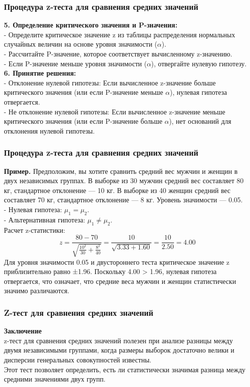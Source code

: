 \documentclass[aspectratio=169]{beamer}
\begin{document}
\begin{frame}
\frametitle{Процедура z-теста для сравнения средних значений}
{\bf 5. Определение критического значения и P-значения:}\\
- Определите критическое значение z из таблицы распределения нормальных случайных величин на основе уровня значимости ($\alpha$).\\
- Рассчитайте P-значение, которое соответствует вычисленному z-значению.\\
- Если P-значение меньше уровня значимости ($\alpha$), отвергайте нулевую гипотезу.\\
{\bf 6. Принятие решения:}\\
- Отклонение нулевой гипотезы: Если вычисленное z-значение больше критического значения (или если P-значение меньше $\alpha$), нулевая гипотеза отвергается.\\
- Не отклонение нулевой гипотезы: Если вычисленное z-значение меньше критического значения (или если P-значение больше $\alpha$), нет оснований для отклонения нулевой гипотезы.
\end{frame}

\begin{frame}
\frametitle{Процедура z-теста для сравнения средних значений}
{\bf Пример.} Предположим, вы хотите сравнить средний вес мужчин и женщин в двух независимых группах. В выборке из 30 мужчин средний вес составляет 80 кг, стандартное отклонение — 10 кг. В выборке из 40 женщин средний вес составляет 70 кг, стандартное отклонение — 8 кг. Уровень значимости — 0.05.\\
- Нулевая гипотеза: \( \mu_1 = \mu_2 \).\\
- Альтернативная гипотеза: \( \mu_1 \ne \mu_2 \).\\
Расчет z-статистики:
\[
z = \frac{80 - 70}{\sqrt{\frac{10^2}{30} + \frac{8^2}{40}}} = \frac{10}{\sqrt{3.33 + 1.60}} = \frac{10}{2.50} = 4.00
\]
Для уровня значимости 0.05 и двустороннего теста критическое значение z приблизительно равно ±1.96. Поскольку 4.00 > 1.96, нулевая гипотеза отвергается, что означает, что средние веса мужчин и женщин статистически значимо различаются.
\end{frame}

\begin{frame}
\frametitle{Z-тест для сравнения средних значений}
{\bf Заключение}
\newline\\
z-тест для сравнения средних значений полезен при анализе разницы между двумя независимыми группами, когда размеры выборок достаточно велики и дисперсии генеральных совокупностей известны.\\
Этот тест позволяет определить, есть ли статистически значимая разница между средними значениями двух групп.
\end{frame}
\end{document}
